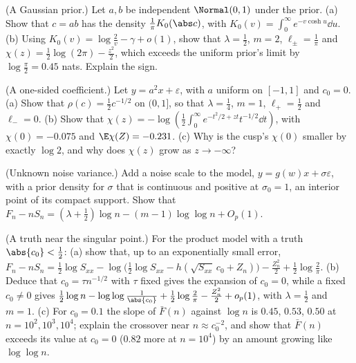 \begin{refsection}
\begin{exercises}
\item \byhand (A Gaussian prior.) Let $a,b$ be independent $\Normal(0,1)$ under the prior. (a) Show that $c=ab$ has the density $\frac1\pi K_0(\abs c)$, with $K_0(v)=\int_0^\infty e^{-v\cosh u}\dd u$. (b) Using $K_0(v)=\log\frac2v-\gamma+o(1)$, show that $\lambda=\frac12$, $m=2$, $\ell_\pm=\frac1\pi$ and $\chi(z)=\frac12\log(2\pi)-\frac{z^2}2$, which exceeds the uniform prior's limit by $\log\frac\pi2=0.45$ nats. Explain the sign.\label{ex:coefficient:gaussian}

\item \byhand (A one-sided coefficient.) Let $y=a^2x+\varepsilon$, with $a$ uniform on $[-1,1]$ and $c_0=0$. (a) Show that $\rho(c)=\frac12c^{-1/2}$ on $(0,1]$, so that $\lambda=\frac14$, $m=1$, $\ell_+=\frac12$ and $\ell_-=0$. (b) Show that $\chi(z)=-\log(\frac12\int_0^\infty e^{-t^2/2+zt}t^{-1/2}\dd t)$, with $\chi(0)=-0.075$ and $\E\chi(Z)=-0.231$. (c) Why is the cusp's $\chi(0)$ smaller by exactly $\log2$, and why does $\chi(z)$ grow as $z\to-\infty$?\label{ex:coefficient:onesided}

\item \variation\hard (Unknown noise variance.) Add a noise scale to the model, $y=g(w)x+\sigma\varepsilon$, with a prior density for $\sigma$ that is continuous and positive at $\sigma_0=1$, an interior point of its compact support. Show that $F_n-nS_n=(\lambda+\frac12)\log n-(m-1)\log\log n+O_p(1)$. \label{ex:coefficient:variance}

\item \variation (A truth near the singular point.) For the product model with a truth $\abs{c_0}<\frac12$: (a) show that, up to an exponentially small error, $F_n-nS_n=\frac12\log S_{xx}-\log\bigl(\frac12\log S_{xx}-h(\sqrt{S_{xx}}\,c_0+Z_n)\bigr)-\frac{Z_n^2}2+\frac12\log\frac2\pi$. (b) Deduce that $c_0=\tau n^{-1/2}$ with $\tau$ fixed gives the expansion of $c_0=0$, while a fixed $c_0\ne0$ gives $\frac12\log n-\log\log\frac1{\abs{c_0}}+\frac12\log\frac2\pi-\frac{Z_n^2}2+o_p(1)$, with $\lambda=\frac12$ and $m=1$. (c) For $c_0=0.1$ the slope of $\bar F(n)$ against $\log n$ is $0.45$, $0.53$, $0.50$ at $n=10^2,10^3,10^4$; explain the crossover near $n\approx c_0^{-2}$, and show that $\bar F(n)$ exceeds its value at $c_0=0$ ($0.82$ more at $n=10^4$) by an amount growing like $\log\log n$.\label{ex:coefficient:near}


\end{exercises}
\end{refsection}
